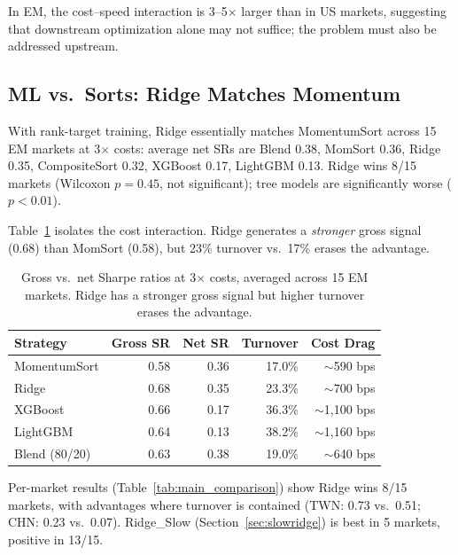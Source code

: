\documentclass[sigconf,review,anonymous,balance=false]{acmart}
\begin{document}
In EM, the cost--speed interaction is 3--5$\times$ larger than in US
markets, suggesting that downstream optimization alone may not
suffice; the problem must also be addressed upstream.


\subsection{ML vs.\ Sorts: Ridge Matches Momentum}
\label{sec:ml_vs_sorts}

With rank-target training, Ridge essentially matches MomentumSort across
15 EM markets at 3$\times$ costs: average net SRs are Blend 0.38,
MomSort 0.36, Ridge 0.35, CompositeSort 0.32, XGBoost 0.17, LightGBM
0.13. Ridge wins 8/15 markets (Wilcoxon $p = 0.45$, not significant);
tree models are significantly worse ($p < 0.01$).

Table~\ref{tab:gross_vs_net} isolates the cost interaction. Ridge
generates a \emph{stronger} gross signal (0.68) than MomSort (0.58),
but 23\% turnover vs.\ 17\% erases the advantage.

\begin{table}[t]
\centering
\caption{Gross vs.\ net Sharpe ratios at 3$\times$ costs, averaged
across 15 EM markets. Ridge has a stronger gross signal but higher
turnover erases the advantage.}
\label{tab:gross_vs_net}
\small
\begin{tabular}{@{}lrrrr@{}}
\toprule
Strategy & Gross SR & Net SR & Turnover & Cost Drag \\
\midrule
MomentumSort  & 0.58 &  0.36  & 17.0\% & $\sim$590 bps \\
Ridge         & 0.68 &  0.35  & 23.3\% & $\sim$700 bps \\
XGBoost       & 0.66 &  0.17  & 36.3\% & $\sim$1{,}100 bps \\
LightGBM      & 0.64 &  0.13  & 38.2\% & $\sim$1{,}160 bps \\
Blend (80/20) & 0.63 &  0.38  & 19.0\% & $\sim$640 bps \\
\bottomrule
\end{tabular}
\end{table}


Per-market results (Table~\ref{tab:main_comparison}) show Ridge wins
8/15 markets, with advantages where turnover is contained (TWN: 0.73
vs.\ 0.51; CHN: 0.23 vs.\ 0.07). Ridge\_Slow
(Section~\ref{sec:slowridge}) is best in 5 markets, positive in 13/15.
\end{document}
